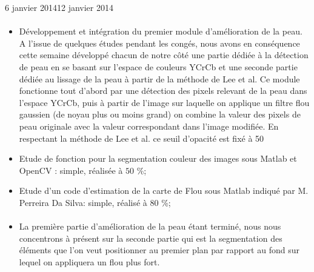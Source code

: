 \documentclass[11pt, french,screen]{report-rd-info}
\begin{document}
\begin{fichesuivi}{6 janvier 2014}{12 janvier 2014}
\paragraph{}
	\begin{travaileffectue}
		\begin{itemize}
			\item Développement et intégration du premier module d’amélioration de la peau. A l’issue de quelques études pendant les congés, nous avons en conséquence cette semaine développé chacun de notre côté une partie dédiée à la détection de peau en se basant sur l’espace de couleurs YCrCb et une seconde partie dédiée au lissage de la peau à partir de la méthode de Lee et al. Ce module fonctionne tout d’abord par une détection des pixels relevant de la peau dans l’espace YCrCb, puis à partir de l’image sur laquelle on applique un filtre flou gaussien (de noyau plus ou moins grand) on combine la valeur des pixels de peau originale avec la valeur correspondant dans l’image modifiée. En respectant la méthode de Lee et al. ce seuil d’opacité est fixé à 50%
			\item Etude de fonction pour la segmentation couleur des images sous Matlab et OpenCV : simple, réalisée à $50$ \%;
			\item Etude d’un code d’estimation de la carte de Flou sous Matlab indiqué par M. Perreira Da Silva: simple, réalisé à $80$ \%;
		\end{itemize}
	\end{travaileffectue}

\paragraph*{}
	\begin{planification}
		\begin{itemize}
			\item La première partie d’amélioration de la peau étant terminé, nous nous concentrons à présent sur la seconde partie qui est la segmentation des éléments que l’on veut positionner au premier plan par rapport au fond sur lequel on appliquera un flou plus fort.		
\end{itemize}
	\end{planification}
\end{fichesuivi}
\end{document}
